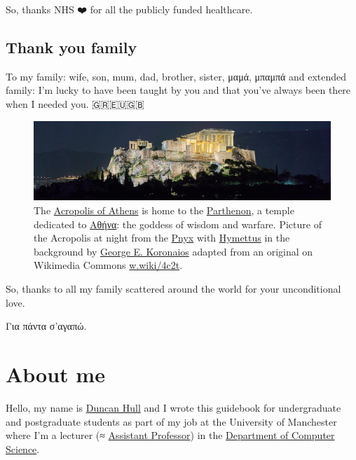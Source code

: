 \documentclass[
]{book}
\begin{document}
So, thanks NHS ❤️ for all the publicly funded healthcare. 🙏

\hypertarget{family}{%
\subsection{Thank you family}\label{family}}

To my family: wife, son, mum, dad, brother, sister, μαμά, μπαμπά and extended family: I'm lucky to have been taught by you and that you've always been there when I needed you. 🇬🇷🇪🇺🇬🇧

\begin{figure}
\includegraphics[width=1\linewidth]{images/acropolis-at-night} \caption{The \href{https://en.wikipedia.org/wiki/Acropolis_of_Athens}{Acropolis of Athens} is home to the \href{https://en.wikipedia.org/wiki/Parthenon}{Parthenon}, a temple dedicated to \href{https://en.wikipedia.org/wiki/Athena}{Αθήνα}: the goddess of wisdom and warfare. Picture of the Acropolis at night from the \href{https://en.wikipedia.org/wiki/Pnyx}{Pnyx} with \href{https://en.wikipedia.org/wiki/Hymettus}{Hymettus} in the background by \href{https://commons.wikimedia.org/wiki/User:George_E._Koronaios}{George E. Koronaios} adapted from an original on Wikimedia Commons \href{https://w.wiki/4c2t}{w.wiki/4c2t}.}\label{fig:acropolis-fig}
\end{figure}



So, thanks to all my family scattered around the world for your unconditional love.

Για πάντα σ'αγαπώ. 🙏

\hypertarget{duncan}{%
\section{About me}\label{duncan}}

Hello, my name is \href{https://personalpages.manchester.ac.uk/staff/duncan.hull/}{Duncan Hull} and I wrote this guidebook for undergraduate and postgraduate students as part of my job at the University of Manchester where I'm a lecturer (≈ \href{https://en.wikipedia.org/wiki/Assistant_professor}{Assistant Professor}) in the \href{https://www.cs.manchester.ac.uk/}{Department of Computer Science}.
\end{document}
